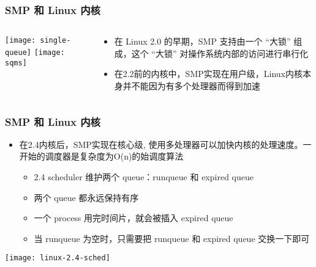 \begin{frame}
	\frametitle{SMP 和 Linux 内核}
	\begin{columns}
	\begin{column}{.4\textwidth}
	\Large \centering
	
    \texttt{[image: single-queue]}
	\texttt{[image: sqms]}	
	\end{column}
	
	\begin{column}{.6\textwidth}
\begin{itemize}
	\item 在 Linux 2.0 的早期，SMP 支持由一个 “大锁” 组成，这个 “大锁” 对操作系统内部的访问进行串行化
	\item 在2.2前的内核中，SMP实现在用户级，Linux内核本身并不能因为有多个处理器而得到加速

	\end{itemize}

	\end{column}
\end{columns}
\end{frame}


\begin{frame}
	\frametitle{SMP 和 Linux 内核}
	
	\begin{itemize}
		
		\item 在2.4内核后，SMP实现在核心级, 使用多处理器可以加快内核的处理速度。一开始的调度器是复杂度为O(n)的始调度算法
		
		\begin{itemize}
			\item 2.4 scheduler 维护两个 queue：runqueue 和 expired queue
			\item 两个 queue 都永远保持有序
			\item 一个 process 用完时间片，就会被插入 expired queue
			\item 当 runqueue 为空时，只需要把 runqueue 和 expired queue 交换一下即可
		\end{itemize}
	\end{itemize}
	
	\texttt{[image: linux-2.4-sched]}
	
	
\end{frame}

